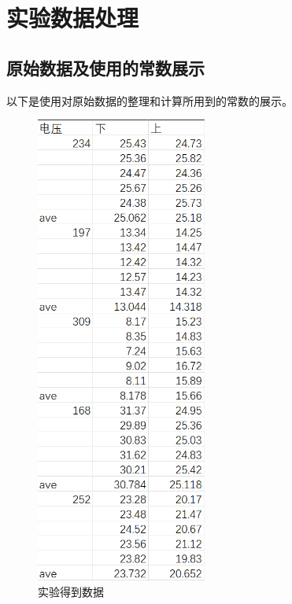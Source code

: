 \documentclass{ctexart}
\begin{document}
\section{实验数据处理}
  \subsection{原始数据及使用的常数展示}
  以下是使用对原始数据的整理和计算所用到的常数的展示。

  \begin{figure}[H]
    \centering
    \includegraphics[width=0.5\textwidth,height=0.7\textheight]{shijianshujv.png}
    \caption{实验得到数据}\label{shiyanshujv}
  \end{figure}
  \newpage
\end{document}
